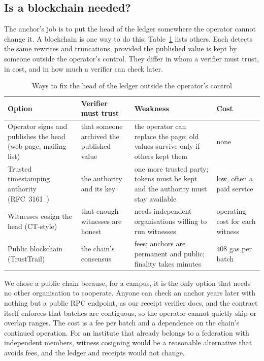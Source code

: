 \subsection{Is a blockchain needed?}
The anchor's job is to put the head of the ledger somewhere the operator cannot change it. A blockchain is one way to do this; Table~\ref{tab:anchor-alternatives} lists others. Each detects the same rewrites and truncations, provided the published value is kept by someone outside the operator's control. They differ in whom a verifier must trust, in cost, and in how much a verifier can check later.

\begin{table}[t]
\centering
\caption{Ways to fix the head of the ledger outside the operator's control}
\label{tab:anchor-alternatives}
\small
\begin{tabularx}{\linewidth}{@{}>{\raggedright\arraybackslash}p{3.4cm} >{\raggedright\arraybackslash}X >{\raggedright\arraybackslash}X >{\raggedright\arraybackslash}p{2.6cm}@{}}
\toprule
Option & Verifier must trust & Weakness & Cost \\
\midrule
Operator signs and publishes the head (web page, mailing list) & that someone archived the published value & the operator can replace the page; old values survive only if others kept them & none \\
Trusted timestamping authority (RFC~3161~\cite{rfc3161}) & the authority and its key & one more trusted party; tokens must be kept and the authority must stay available & low, often a paid service \\
Witnesses cosign the head (CT-style) & that enough witnesses are honest & needs independent organisations willing to run witnesses & operating cost for each witness \\
Public blockchain (TrustTrail) & the chain's consensus & fees; anchors are permanent and public; finality takes minutes & 254{,}408 gas per batch \\
\bottomrule
\end{tabularx}
\end{table}

We chose a public chain because, for a campus, it is the only option that needs no other organisation to cooperate. Anyone can check an anchor years later with nothing but a public RPC endpoint, as our receipt verifier does, and the contract itself enforces that batches are contiguous, so the operator cannot quietly skip or overlap ranges. The cost is a fee per batch and a dependence on the chain's continued operation. For an institute that already belongs to a federation with independent members, witness cosigning would be a reasonable alternative that avoids fees, and the ledger and receipts would not change.

